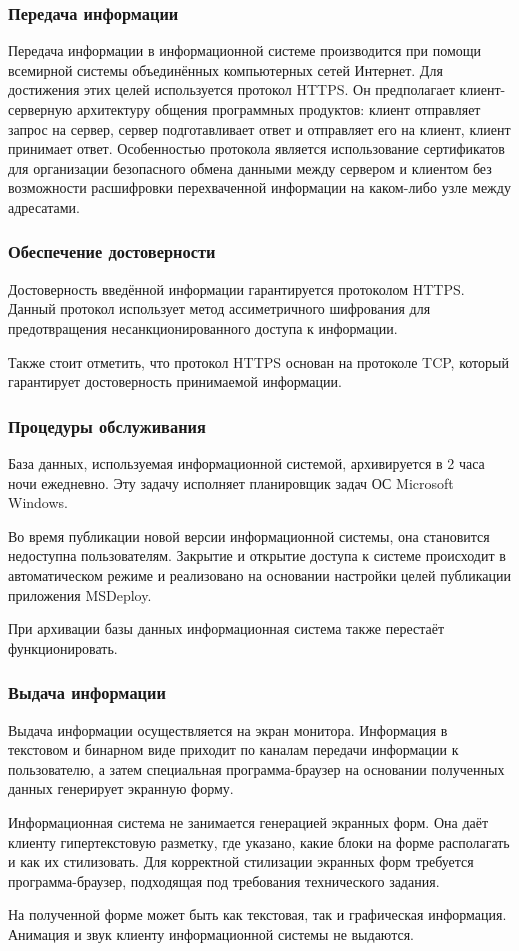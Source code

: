 \subsubsection{Передача информации}

Передача информации в информационной системе производится при помощи всемирной системы объединённых компьютерных сетей Интернет.
Для достижения этих целей используется протокол HTTPS.
Он предполагает клиент-серверную архитектуру общения программных продуктов: клиент отправляет запрос на сервер, сервер подготавливает ответ и отправляет его на клиент, клиент принимает ответ.
Особенностью протокола является использование сертификатов для организации безопасного обмена данными между сервером и клиентом без возможности расшифровки перехваченной информации на каком-либо узле между адресатами.

\subsubsection{Обеспечение достоверности}

Достоверность введённой информации гарантируется протоколом HTTPS.
Данный протокол использует метод ассиметричного шифрования для предотвращения несанкционированного доступа к информации.

Также стоит отметить, что протокол HTTPS основан на протоколе TCP, который гарантирует достоверность принимаемой информации.

\subsubsection{Процедуры обслуживания}

База данных, используемая информационной системой, архивируется в 2 часа ночи ежедневно.
Эту задачу исполняет планировщик задач ОС Microsoft Windows.

Во время публикации новой версии информационной системы, она становится недоступна пользователям.
Закрытие и открытие доступа к системе происходит в автоматическом режиме и реализовано на основании настройки целей публикации приложения MSDeploy.

При архивации базы данных информационная система также перестаёт функционировать.

\subsubsection{Выдача информации}

Выдача информации осуществляется на экран монитора.
Информация в текстовом и бинарном виде приходит по каналам передачи информации к пользователю, а затем специальная программа-браузер на основании полученных данных генерирует экранную форму.

Информационная система не занимается генерацией экранных форм.
Она даёт клиенту гипертекстовую разметку, где указано, какие блоки на форме располагать и как их стилизовать.
Для корректной стилизации экранных форм требуется программа-браузер, подходящая под требования технического задания.

На полученной форме может быть как текстовая, так и графическая информация. Анимация и звук клиенту информационной системы не выдаются.

\clearpage
\newpage